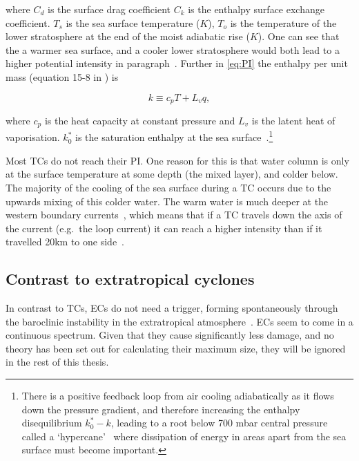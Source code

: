 where $C_d$ is the surface drag coefficient $C_k$ is the
 enthalpy surface exchange coefficient.
$T_s$ is the sea surface temperature ($K$), $T_o$ is the temperature of the
lower stratosphere at the end of the moist adiabatic rise ($K$).
One can see that the a warmer sea surface, and a cooler lower stratosphere
would both lead to a higher potential intensity in paragraph~\cite{emanuel1991theory, emanuel2018progress}.
Further in \ref{eq:PI} the enthalpy per unit mass (equation 15-8 in \cite{emanuel2018progress}) is


\begin{equation}
k \equiv c_{p} T+L_{v} q,
\label{eq:enthalpy_per_unit_mass}
\end{equation}



where $c_p$ is the heat capacity at constant pressure and $L_{v}$ is the latent heat
of vaporisation. $k_{0}^{*}$ is the saturation enthalpy at the sea
surface~\cite{emanuel2018progress}.\footnote{
There is a positive feedback loop from air cooling adiabatically as it flows down
the pressure gradient, and therefore increasing the enthalpy disequilibrium
$k_{0}^{*}-k$, leading to a root below 700 mbar central pressure called a `hypercane'~\cite{emanuel1987dependence}
where dissipation of energy in areas apart from the sea surface must become important.

}





Most TCs do not reach their PI.
One reason for this is that
water column is only at the surface temperature
at some depth (the mixed layer), and colder below.
The majority of the cooling of
the sea surface during a TC occurs due to the
upwards mixing of this colder water.
The warm water
is much deeper at the western boundary currents~\cite{hogg1995western},
which means that if a TC
travels down the axis of the current (e.g.~the loop current)
it can reach a higher intensity than
if it travelled 20km to one side~\cite{emanuel2005divine}.


\subsection{Contrast to extratropical cyclones}
In contrast to TCs,  ECs do not need a trigger, forming
spontaneously through the baroclinic instability
in the extratropical atmosphere~\cite{lorenz1960energy}.
ECs seem to come in a continuous spectrum.
Given that they cause
significantly less damage, and no theory has been
 set out for calculating their maximum size,
they will be ignored in the rest of this thesis.
